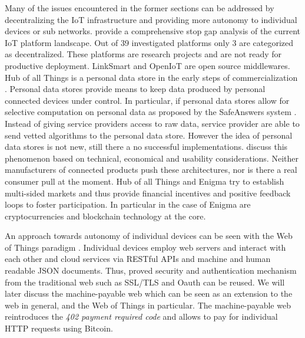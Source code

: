 Many of the issues encountered in the former sections can be addressed by decentralizing the IoT infrastructure and providing more autonomy to individual devices or sub networks. \cite{ISI:000379632700002} provide a comprehensive stop gap analysis of the current IoT platform landscape. Out of 39 investigated platforms only 3 are categorized as decentralized. These platforms are research projects and are not ready for productive deployment. LinkSmart and OpenIoT are open source middlewares. Hub of all Things is a personal data store in the early steps of commercialization \parencite{ng2014engineering}. Personal data stores provide means to keep data produced by personal connected devices under control. In particular, if personal data stores allow for selective computation on personal data as proposed by the SafeAnswers system \parencite{10.1371/journal.pone.0098790}. Instead of giving service providers access to raw data, service provider are able to send vetted algorithms to the personal data store. However the idea of personal data stores is not new, still there a no successful implementations. \cite{DBLP:journals/corr/abs-1202-4503} discuss this phenomenon based on technical, economical and usability considerations. Neither manufacturers of connected products push these architectures, nor is there a real consumer pull at the moment. Hub of all Things and Enigma \parencite{7163223} try to establish multi-sided markets and thus provide financial incentives and positive feedback loops to foster participation. In particular in the case of Enigma are cryptocurrencies and blockchain technology at the core.

An approach towards autonomy of individual devices can be seen with the Web of Things paradigm \parencite{Guinard2011}. Individual devices employ web servers and interact with each other and cloud services via RESTful APIs and machine and human readable JSON documents. Thus, proved security and authentication mechanism from the traditional web such as SSL/TLS and Oauth \parencite{Leiba2012} can be reused. We will later discuss the machine-payable web which can be seen as an extension to the web in general, and the Web of Things in particular. The machine-payable web reintroduces the \emph{402 payment required code} and allows to pay for individual HTTP requests using Bitcoin. 

